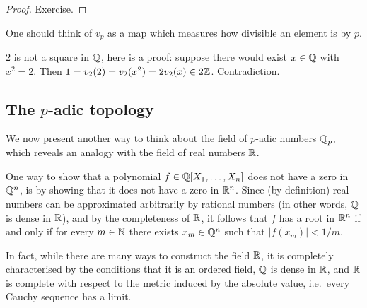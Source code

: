 \documentclass[12pt, leqno, british]{amsart}
\begin{document}
\begin{proof}
Exercise.
\end{proof}
One should think of $v_p$ as a map which measures how divisible an element is by $p$.
\begin{eg}
$2$ is not a square in $\mathbb Q$, here is a proof: suppose there would exist $x \in \mathbb Q$ with $x^2 = 2$.
Then $1 = v_2(2) = v_2(x^2) = 2v_2(x) \in 2\mathbb Z$.
Contradiction.
\end{eg}

\subsection{The $p$-adic topology}
We now present another way to think about the field of $p$-adic numbers $\mathbb Q_p$, which reveals an analogy with the field of real numbers $\mathbb R$.

One way to show that a polynomial $f \in \mathbb Q[X_1, \ldots, X_n]$ does not have a zero in $\mathbb Q^n$, is by showing that it does not have a zero in $\mathbb R^n$.
Since (by definition) real numbers can be approximated arbitrarily by rational numbers (in other words, $\mathbb Q$ is dense in $\mathbb R$), and by the completeness of $\mathbb R$, it follows that $f$ has a root in $\mathbb R^n$ if and only if for every $m \in \mathbb N$ there exists $x_m \in \mathbb Q^n$ such that $\lvert f(x_m) \rvert < 1/m$.

In fact, while there are many ways to construct the field $\mathbb R$, it is completely characterised by the conditions that it is an ordered field, $\mathbb Q$ is dense in $\mathbb R$, and $\mathbb R$ is complete with respect to the metric induced by the absolute value, i.e.~every Cauchy sequence has a limit.
\end{document}
